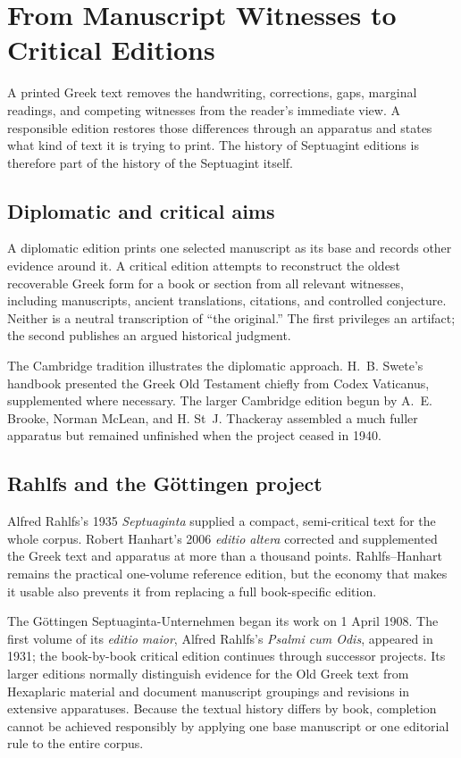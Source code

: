\section{From Manuscript Witnesses to Critical Editions}

A printed Greek text removes the handwriting, corrections, gaps, marginal readings, and competing witnesses from the reader's immediate view. A responsible edition restores those differences through an apparatus and states what kind of text it is trying to print. The history of Septuagint editions is therefore part of the history of the Septuagint itself.

\subsection{Diplomatic and critical aims}

A diplomatic edition prints one selected manuscript as its base and records other evidence around it. A critical edition attempts to reconstruct the oldest recoverable Greek form for a book or section from all relevant witnesses, including manuscripts, ancient translations, citations, and controlled conjecture. Neither is a neutral transcription of ``the original.'' The first privileges an artifact; the second publishes an argued historical judgment.

The Cambridge tradition illustrates the diplomatic approach. H.~B. Swete's handbook presented the Greek Old Testament chiefly from Codex Vaticanus, supplemented where necessary. The larger Cambridge edition begun by A.~E. Brooke, Norman McLean, and H. St~J. Thackeray assembled a much fuller apparatus but remained unfinished when the project ceased in 1940.

\subsection{Rahlfs and the Göttingen project}

Alfred Rahlfs's 1935 \emph{Septuaginta} supplied a compact, semi-critical text for the whole corpus. Robert Hanhart's 2006 \emph{editio altera} corrected and supplemented the Greek text and apparatus at more than a thousand points. Rahlfs--Hanhart remains the practical one-volume reference edition, but the economy that makes it usable also prevents it from replacing a full book-specific edition.

The Göttingen Septuaginta-Unternehmen began its work on 1 April 1908. The first volume of its \emph{editio maior}, Alfred Rahlfs's \emph{Psalmi cum Odis}, appeared in 1931; the book-by-book critical edition continues through successor projects. Its larger editions normally distinguish evidence for the Old Greek text from Hexaplaric material and document manuscript groupings and revisions in extensive apparatuses. Because the textual history differs by book, completion cannot be achieved responsibly by applying one base manuscript or one editorial rule to the entire corpus.

